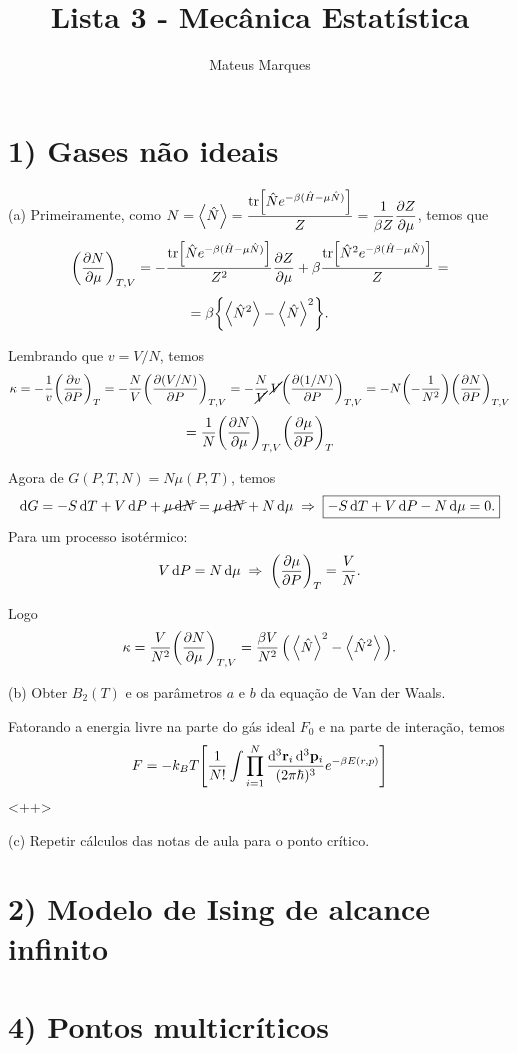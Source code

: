 \documentclass[a4paper,10pt]{article}
\title{\Huge{\textbf{Lista 3 - Mecânica Estatística}}}
\author{Mateus Marques}
\begin{document}
\maketitle

\section*{1) Gases não ideais}

(a) Primeiramente, como $\displaystyle{N = \ev{\hat{N}} = \frac{\tr[\hat{N} e^{-\beta(\hat{H} - \mu \hat{N})}]}{Z} = \frac{1}{\beta Z} \pdv{Z}{\mu}}$, temos que
$$
\qty(\pdv{N}{\mu})_{T,V} = - \frac{\tr[\hat{N} e^{-\beta(\hat{H} - \mu \hat{N})}]}{Z^2} \pdv{Z}{\mu} +
\beta \frac{\tr[\hat{N}^2 e^{-\beta(\hat{H} - \mu \hat{N})}]}{Z} =
$$
$$
= \beta \qty{ \ev{\hat{N}^2} - \ev{\hat{N}}^2 }.
$$


Lembrando que $v = V/N$, temos
$$
\kappa = - \frac{1}{v} \qty(\pdv{v}{P})_{T} = - \frac{N}{V} \qty(\pdv{(V/N)}{P})_{T,V} =
- \frac{N}{\cancel{V}} \, \cancel{V} \qty(\pdv{(1/N)}{P})_{T, V} = -N \qty(-\frac{1}{N^2}) \qty(\pdv{N}{P})_{T,V}
$$
$$
= \frac{1}{N} \qty(\pdv{N}{\mu})_{T,V} \qty(\pdv{\mu}{P})_{T}
$$

Agora de $G(P,T,N) = N \mu(P,T)$, temos
$$
\dd{G} = -S \dd{T} + V \dd{P} + \cancel{\mu \dd{N}} = \cancel{\mu \dd{N}} + N \dd{\mu} \; \Rightarrow \;
\boxed{ -S \dd{T} + V \dd{P} - N \dd{\mu} = 0. }
$$
Para um processo isotérmico:
$$
V \dd{P} = N \dd{\mu} \; \Rightarrow \; \qty(\pdv{\mu}{P})_{T} = \frac{V}{N}.
$$

Logo
$$
\kappa = \frac{V}{N^2} \pdvc{N}{\mu}{T,V} = \frac{\beta V}{N^2} \, \Big(\ev{\hat{N}}^2 - \ev{\hat{N}^2}\Big).
$$

\n\n\n

(b) Obter $B_2(T)$ e os parâmetros $a$ e $b$ da equação de Van der Waals.

Fatorando a energia livre na parte do gás ideal $F_0$ e na parte de interação, temos
$$
F = - k_B T \qty[
\frac{1}{N!} \int \prod_{i=1}^N \frac{\dd[3]{\vb{r}_i} \dd[3]{\vb{p}_i}}{(2\pi \hbar)^3} e^{-\beta E(r,p)}
]
$$
<++>


(c) Repetir cálculos das notas de aula para o ponto crítico.


\pagebreak

\section*{2) Modelo de Ising de alcance infinito}



\pagebreak

\section*{4) Pontos multicríticos}
\end{document}
